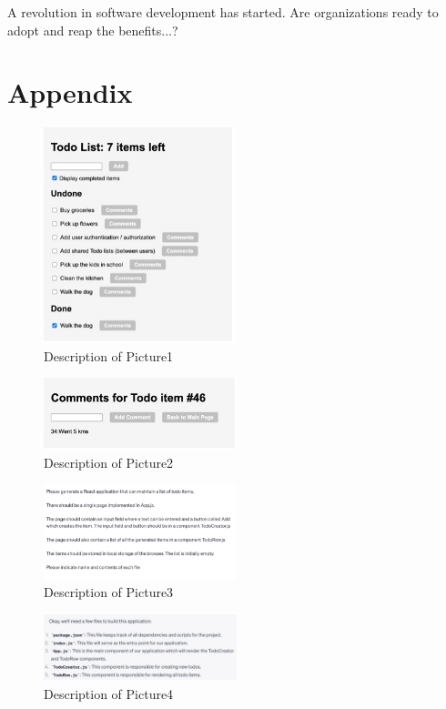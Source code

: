 \documentclass[runningheads]{llncs}
\begin{document}
A revolution in software development has started. Are organizations ready to adopt and reap the benefits...?

\appendix
\section*{Appendix}
\begin{figure}[h]
    \centering
    \includegraphics[width=0.5\textwidth]{Pictures/Picture1.jpg}
    \caption{Description of Picture1}
    \label{fig:picture1}
\end{figure}
\begin{figure}[h]
    \centering
    \includegraphics[width=0.5\textwidth]{Pictures/Picture2.jpg}
    \caption{Description of Picture2}
    \label{fig:picture2}
\end{figure}
\begin{figure}[h]
    \centering
    \includegraphics[width=0.5\textwidth]{Pictures/Picture3.jpg}
    \caption{Description of Picture3}
    \label{fig:picture3}
\end{figure}
\begin{figure}[h]
    \centering
    \includegraphics[width=0.5\textwidth]{Pictures/Picture4.jpg}
    \caption{Description of Picture4}
    \label{fig:picture4}
\end{figure}
\end{document}

